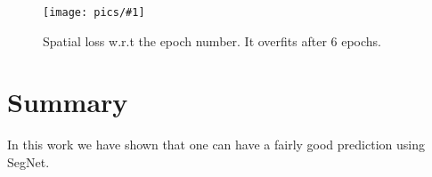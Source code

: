 \documentclass[10pt,conference,compsocconf]{IEEEtran}
\newcommand{\scalefig}[4]{
  \begin{figure}[ht!]
    \centering
    \texttt{[image: pics/\#1]}
 \caption{#3}
    \label{#4}
  \end{figure}}
\begin{document}
\scalefig{overfitting}{0.9}{Spatial loss w.r.t the epoch number. It overfits after 6 epochs.}{fig:overfit}


\section{Summary}
In this work we have shown that one can have a fairly good prediction using SegNet.



%
%




\end{document}

